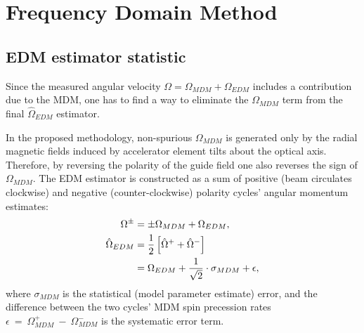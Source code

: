 \documentclass[12pt]{article}
\newcommand{\avg}[1]{\langle{#1}\rangle}
\newcommand{\W}{\Omega}
\begin{document}
%
%

\section{Frequency Domain Method}
\subsection{EDM estimator statistic}
Since the measured angular velocity $\W = \W_{MDM} + \W_{EDM}$ includes a contribution due to the MDM, one has to find a way to eliminate the $\W_{MDM}$ term from the final $\hat\W_{EDM}$ estimator. 

In the proposed methodology, non-spurious $\W_{MDM}$ is generated only by the radial magnetic fields induced by accelerator element tilts about the optical axis. Therefore, by reversing the polarity of the guide field one also reverses the sign of $\W_{MDM}$. The EDM estimator is constructed as a sum of positive (beam circulates clockwise) and negative (counter-clockwise) polarity cycles' angular momentum estimates:
\begin{align}
	\W^{\pm} &= \pm \W_{MDM} + \W_{EDM},\\
	\hat\W_{EDM} &= \frac12\left[\hat\W^+ + \hat\W^-\right] \notag\\
	&= \W_{EDM} + \frac{1}{\sqrt{2}}\cdot\sigma_{MDM} + \epsilon,	
\end{align}
where
$\sigma_{MDM}$ is  the statistical (model parameter estimate) error, and the difference between the two cycles' MDM spin precession rates $\epsilon~=~\W_{MDM}^+~-~\W_{MDM}^-$ is the  systematic error term.
\end{document}
